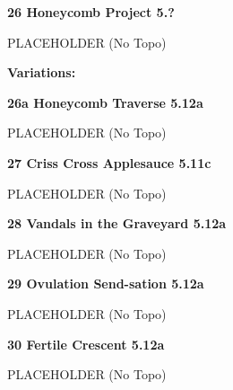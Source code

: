 \begin{multicols}{2}
\needspace{1.5cm}
\label{rt:Honeycomb Project}
\colorbox{black!20}{
\parbox{0.95\linewidth}{
\textbf{
26 Honeycomb Project 5.?  
}}}

\begin{adjustwidth}{0.5cm}{}			
PLACEHOLDER (No Topo)
\end{adjustwidth}

\begin{adjustwidth}{0.5cm}{}				
\needspace{3cm}
\textbf{Variations:} \newline

\needspace{1.5cm}
\label{vr:Honeycomb Traverse}
\colorbox{Goldenrod!50}{
\parbox{0.95\linewidth}{
\textbf{
26a Honeycomb Traverse 5.12a  
}}}

\begin{adjustwidth}{0.5cm}{}			
PLACEHOLDER (No Topo)
\end{adjustwidth}


\end{adjustwidth}


\needspace{1.5cm}
\label{rt:Criss Cross Applesauce}
\colorbox{RoyalBlue!20}{
\parbox{0.95\linewidth}{
\textbf{
27 Criss Cross Applesauce 5.11c  
}}}

\begin{adjustwidth}{0.5cm}{}			
PLACEHOLDER (No Topo)
\end{adjustwidth}



\needspace{1.5cm}
\label{rt:Vandals in the Graveyard}
\colorbox{Goldenrod!50}{
\parbox{0.95\linewidth}{
\textbf{
28 Vandals in the Graveyard 5.12a  
}}}

\begin{adjustwidth}{0.5cm}{}			
PLACEHOLDER (No Topo)
\end{adjustwidth}



\needspace{1.5cm}
\label{rt:Ovulation Send-sation}
\colorbox{Goldenrod!50}{
\parbox{0.95\linewidth}{
\textbf{
29 Ovulation Send-sation 5.12a  
}}}

\begin{adjustwidth}{0.5cm}{}			
PLACEHOLDER (No Topo)
\end{adjustwidth}



\needspace{1.5cm}
\label{rt:Fertile Crescent}
\colorbox{Goldenrod!50}{
\parbox{0.95\linewidth}{
\textbf{
30 Fertile Crescent 5.12a  
}}}

\begin{adjustwidth}{0.5cm}{}			
PLACEHOLDER (No Topo)
\end{adjustwidth}




\end{multicols}
